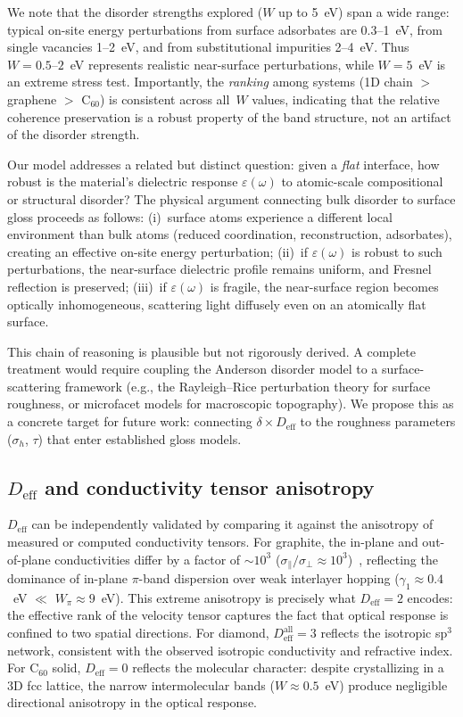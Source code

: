 \documentclass[twocolumn,showpacs,preprintnumbers,amsmath,amssymb,prb]{revtex4-2}
\begin{document}
We note that the disorder strengths explored ($W$ up to 5~eV) span a
wide range: typical on-site energy perturbations from surface
adsorbates are 0.3--1~eV, from single vacancies 1--2~eV, and from
substitutional impurities 2--4~eV. Thus $W = 0.5$--$2$~eV represents
realistic near-surface perturbations, while $W = 5$~eV is an extreme
stress test. Importantly, the \emph{ranking} among systems (1D chain
$>$ graphene $>$ C$_{60}$) is consistent across all~$W$ values,
indicating that the relative coherence preservation is a robust
property of the band structure, not an artifact of the disorder
strength.

Our model addresses a related but distinct question: given a
\emph{flat} interface, how robust is the material's dielectric
response $\varepsilon(\omega)$ to atomic-scale compositional or
structural disorder? The physical argument connecting bulk disorder
to surface gloss proceeds as follows: (i)~surface atoms experience
a different local environment than bulk atoms (reduced coordination,
reconstruction, adsorbates), creating an effective on-site energy
perturbation; (ii)~if $\varepsilon(\omega)$ is robust to such
perturbations, the near-surface dielectric profile remains uniform,
and Fresnel reflection is preserved; (iii)~if $\varepsilon(\omega)$
is fragile, the near-surface region becomes optically inhomogeneous,
scattering light diffusely even on an atomically flat surface.

This chain of reasoning is plausible but not rigorously derived.
A complete treatment would require coupling the Anderson disorder
model to a surface-scattering framework (e.g., the Rayleigh--Rice
perturbation theory for surface roughness, or microfacet models for
macroscopic topography). We propose this as a concrete target for
future work: connecting $\delta \times D_\mathrm{eff}$ to the
roughness parameters ($\sigma_h$, $\tau$) that enter established
gloss models.

\subsection{$D_\mathrm{eff}$ and conductivity tensor anisotropy}

$D_\mathrm{eff}$ can be independently validated by comparing it against
the anisotropy of measured or computed conductivity tensors. For
graphite, the in-plane and out-of-plane conductivities differ by a
factor of $\sim$$10^3$ ($\sigma_\parallel / \sigma_\perp \approx
10^3$)~\cite{Spain1981}, reflecting the dominance of in-plane $\pi$-band
dispersion over weak interlayer hopping ($\gamma_1 \approx 0.4$~eV
$\ll$ $W_\pi \approx 9$~eV). This extreme anisotropy is precisely
what $D_\mathrm{eff} = 2$ encodes: the effective rank of the velocity
tensor captures the fact that optical response is confined to two
spatial directions. For diamond, $D_\mathrm{eff}^\mathrm{all} = 3$
reflects the isotropic sp$^3$ network, consistent with the observed
isotropic conductivity and refractive index. For C$_{60}$ solid,
$D_\mathrm{eff} = 0$ reflects the molecular character: despite
crystallizing in a 3D fcc lattice, the narrow intermolecular bands
($W \approx 0.5$~eV) produce negligible directional anisotropy
in the optical response.
\end{document}
